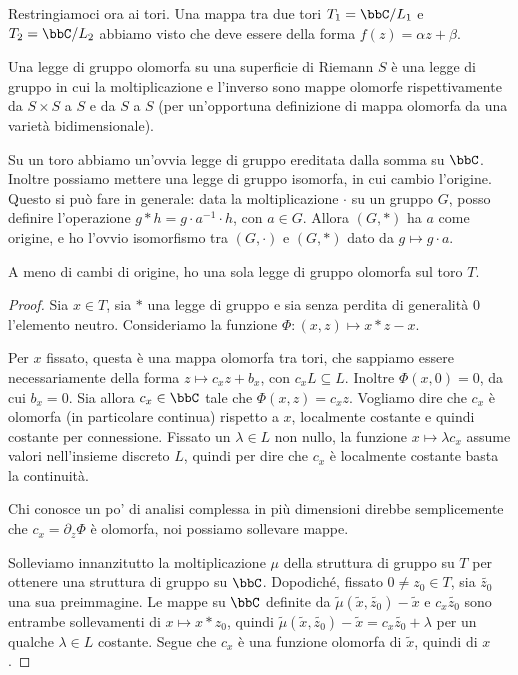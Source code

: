 	Restringiamoci ora ai tori. Una mappa tra due tori $T_1 = \bbC/L_1$ e $T_2 = \bbC/L_2$ abbiamo visto che deve essere della forma $f(z)=\alpha z + \beta$.
	
	\begin{definizione}
		Una legge di gruppo olomorfa su una superficie di Riemann $S$ è una legge di gruppo in cui la moltiplicazione e l'inverso sono mappe olomorfe rispettivamente da $S \times S$ a $S$ e da $S$ a $S$ (per un'opportuna definizione di mappa olomorfa da una varietà bidimensionale).
	\end{definizione}
	
	Su un toro abbiamo un'ovvia legge di gruppo ereditata dalla somma su $\bbC$. Inoltre possiamo mettere una legge di gruppo isomorfa, in cui cambio l'origine. Questo si può fare in generale: data la moltiplicazione $\cdot$ su un gruppo $G$, posso definire l'operazione $g * h = g\cdot a^{-1}\cdot h$, con $a\in G$. Allora $(G,*)$ ha $a$ come origine, e ho l'ovvio isomorfismo tra $(G,\cdot)$ e $(G,*)$ dato da $g\mapsto g\cdot a$.
	
	\begin{proposizione}
		A meno di cambi di origine, ho una sola legge di gruppo olomorfa sul toro $T$.
	\end{proposizione}
	
	\begin{proof}
		Sia $x \in T$, sia $*$ una legge di gruppo e sia senza perdita di generalità $0$ l'elemento neutro. Consideriamo la funzione $\Phi: (x, z) \mapsto x * z - x$.

		Per $x$ fissato, questa è una mappa olomorfa tra tori, che sappiamo essere necessariamente della forma $z \mapsto c_x z + b_x$, con $c_x L \subseteq L$. Inoltre $\Phi(x, 0) = 0$, da cui $b_x = 0$. Sia allora $c_x \in \bbC$ tale che $\Phi(x, z) = c_x z$.
		Vogliamo dire che $c_x$ è olomorfa (in particolare continua) rispetto a $x$, localmente costante e quindi costante per connessione.
		Fissato un $\lambda \in L$ non nullo, la funzione $x \mapsto \lambda c_x$ assume valori nell'insieme discreto $L$, quindi per dire che $c_x$ è localmente costante basta la continuità.
		
		Chi conosce un po' di analisi complessa in più dimensioni direbbe semplicemente che $c_x = \partial_z \Phi$ è olomorfa, noi possiamo sollevare mappe.

		Solleviamo innanzitutto la moltiplicazione $\mu$ della struttura di gruppo su $T$ per ottenere una struttura di gruppo su $\bbC$. Dopodiché, fissato $0 \ne z_0 \in T$, sia $\tilde{z_0}$ una sua preimmagine. Le mappe su $\bbC$ definite da $\tilde{\mu}(\tilde{x}, \tilde{z_0}) - \tilde{x}$ e $c_x \tilde{z_0}$ sono entrambe sollevamenti di $x \mapsto x * z_0$, quindi $\tilde{\mu}(\tilde{x}, \tilde{z_0}) - \tilde{x} = c_x \tilde{z_0} + \lambda$ per un qualche $\lambda \in L$ costante.
		Segue che $c_x$ è una funzione olomorfa di $\tilde{x}$, quindi di $x$.
	\end{proof}

